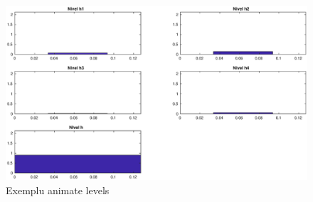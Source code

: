 \documentclass[12pt,english]{article}
\begin{document}
\pagebreak

\begin{center}
	\begin{figure} [htbp]
		\includegraphics[width=1\textwidth]{a_1.eps}
		\caption{Exemplu animate levels}
	\end{figure}
\end{center}
\end{document}
